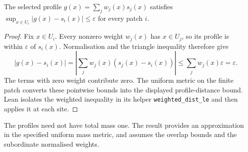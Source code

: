 \begin{claim}
The selected profile $g(x)=\sum_j w_j(x)s_j(x)$ satisfies
$\sup_{x\in U_i}|g(x)-s_i(x)|\leq\varepsilon$ for every patch $i$.
\end{claim}
\begin{proof}
Fix $x\in U_i$. Every nonzero weight $w_j(x)$ has $x\in U_j$, so its profile
is within $\varepsilon$ of $s_i(x)$. Normalisation and the triangle inequality
therefore give
\[
 |g(x)-s_i(x)|
 =\left|\sum_j w_j(x)(s_j(x)-s_i(x))\right|
 \leq\sum_j w_j(x)\varepsilon=\varepsilon.
\]
The terms with zero weight contribute zero. The uniform metric on the finite
patch converts these pointwise bounds into the displayed profile-distance
bound. Lean isolates the weighted inequality in its helper
\texttt{weighted\_dist\_le} and then applies it at each site.
\end{proof}
\scope The profiles need not have total mass one. The result provides an
approximation in the specified uniform mass metric, and assumes the overlap
bounds and the subordinate normalised weights.

